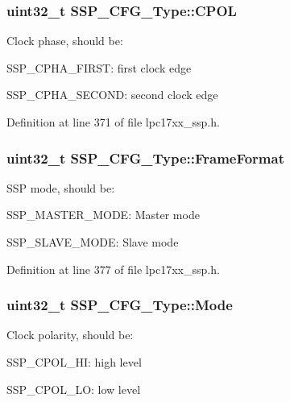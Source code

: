 \hypertarget{struct_s_s_p___c_f_g___type_ac808d0a31a64e1e8ba7a83029cdf7241}{
\subsubsection[{\-C\-P\-O\-L}]{\setlength{\rightskip}{0pt plus 5cm}uint32\-\_\-t {\bf \-S\-S\-P\-\_\-\-C\-F\-G\-\_\-\-Type\-::\-C\-P\-O\-L}}}\label{struct_s_s_p___c_f_g___type_ac808d0a31a64e1e8ba7a83029cdf7241}
\-Clock phase, should be\-:
\begin{DoxyItemize}
\item \-S\-S\-P\-\_\-\-C\-P\-H\-A\-\_\-\-F\-I\-R\-S\-T\-: first clock edge
\item \-S\-S\-P\-\_\-\-C\-P\-H\-A\-\_\-\-S\-E\-C\-O\-N\-D\-: second clock edge 
\end{DoxyItemize}

\-Definition at line 371 of file lpc17xx\-\_\-ssp.\-h.

\hypertarget{struct_s_s_p___c_f_g___type_acaeda2f05cde2ca11a630a953bbfe852}{
\subsubsection[{\-Frame\-Format}]{\setlength{\rightskip}{0pt plus 5cm}uint32\-\_\-t {\bf \-S\-S\-P\-\_\-\-C\-F\-G\-\_\-\-Type\-::\-Frame\-Format}}}\label{struct_s_s_p___c_f_g___type_acaeda2f05cde2ca11a630a953bbfe852}
\-S\-S\-P mode, should be\-:
\begin{DoxyItemize}
\item \-S\-S\-P\-\_\-\-M\-A\-S\-T\-E\-R\-\_\-\-M\-O\-D\-E\-: \-Master mode
\item \-S\-S\-P\-\_\-\-S\-L\-A\-V\-E\-\_\-\-M\-O\-D\-E\-: \-Slave mode 
\end{DoxyItemize}

\-Definition at line 377 of file lpc17xx\-\_\-ssp.\-h.

\hypertarget{struct_s_s_p___c_f_g___type_a1d6f2a353259308dd2f289b88a59742a}{
\subsubsection[{\-Mode}]{\setlength{\rightskip}{0pt plus 5cm}uint32\-\_\-t {\bf \-S\-S\-P\-\_\-\-C\-F\-G\-\_\-\-Type\-::\-Mode}}}\label{struct_s_s_p___c_f_g___type_a1d6f2a353259308dd2f289b88a59742a}
\-Clock polarity, should be\-:
\begin{DoxyItemize}
\item \-S\-S\-P\-\_\-\-C\-P\-O\-L\-\_\-\-H\-I\-: high level
\item \-S\-S\-P\-\_\-\-C\-P\-O\-L\-\_\-\-L\-O\-: low level 
\end{DoxyItemize}

